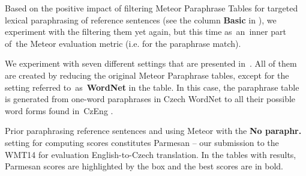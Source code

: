 Based on the positive impact of filtering Meteor Paraphrase Tables for targeted lexical paraphrasing of reference sentences
(see the column \textbf{Basic} in ), we experiment with the 
filtering them yet again, but this time as~an~inner part of~the Meteor evaluation metric (i.e. for the
paraphrase match).

We experiment with seven different settings that are presented in~. All of them are 
created by reducing the original Meteor Paraphrase tables, except for the setting referred 
to~as~\textbf{WordNet} in the table. In this case, the paraphrase table is generated from one-word paraphrases in 
Czech WordNet to all their possible word forms found in~CzEng \cite{czeng}.

Prior paraphrasing reference sentences and using Meteor with the \textbf{No paraphr.} setting
for computing scores constitutes Parmesan -- our submission to the WMT14 for evaluation English-to-Czech 
translation. In the tables with results, Parmesan scores are highlighted by the box and the best scores
are in bold. %

\begin{table*}[htb]
\begin{center}

\vspace{10pt}

\caption{Pearson's correlation of Meteor and the silver standard.}
\label{results:12:13}
\end{center}
\end{table*}



